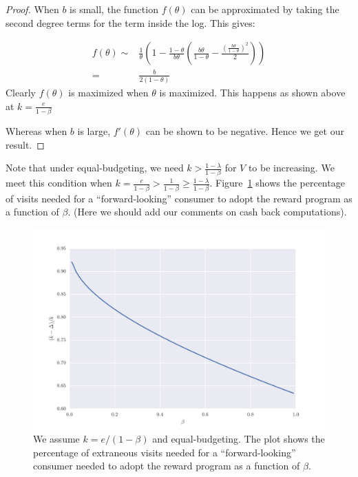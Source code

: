 \begin{proof}
When $b$ is small, the function $f(\theta)$ can be approximated by taking the second degree terms for the term inside the log. This gives:

\begin{align*}
f(\theta) \sim & \frac{1}{\theta} \left(1-\frac{1-\theta}{b\theta}\left(\frac{b\theta}{1-\theta} - \frac{\left(\frac{b\theta}{1-\theta}\right)^2}{2}\right)\right)\\
          = & \frac{b}{2(1-\theta)}
\end{align*}
Clearly $f(\theta)$ is maximized when $\theta$ is maximized. This happens as shown above at $k = \frac{e}{1-\beta}$

Whereas when $b$ is large, $f'(\theta)$ can be shown to be negative. Hence we get our result.

\end{proof}

Note that under equal-budgeting, we need $k > \frac{1-\lambda}{1-\beta}$ for $V$ to be increasing. We meet this condition when $k = \frac{e}{1-\beta} > \frac{1}{1-\beta} \geq \frac{1-\lambda}{1-\beta}$. Figure~\ref{fig:phase_trans} shows the percentage of visits needed for a ``forward-looking'' consumer to adopt the reward program as a function of $\beta$. (Here we should add our comments on cash back computations).

\begin{figure}[h!]
\begin{centering}
\includegraphics[scale = 0.75]{./figures/phase_trans.pdf}
\caption{We assume $k = e/(1-\beta)$ and equal-budgeting. The plot shows the percentage of extraneous visits needed for a ``forward-looking'' consumer needed to adopt the reward program as a function of $\beta$.}
\label{fig:phase_trans}
\end{centering}
\end{figure}

